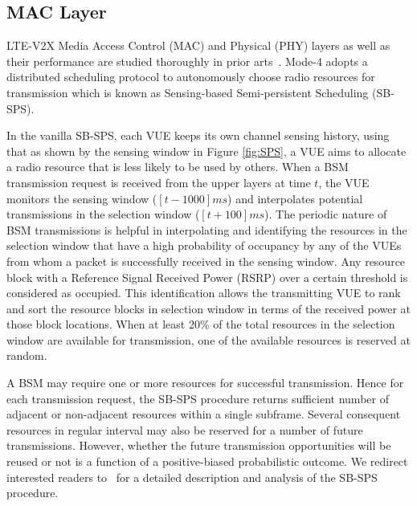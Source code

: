 \documentclass[iicol]{sn-jnl}%
\theoremstyle{thmstyleone}%
\theoremstyle{thmstyletwo}%
\theoremstyle{thmstylethree}%
\begin{document}
\subsection{MAC Layer}
LTE-V2X Media Access Control (MAC) and Physical (PHY) layers as well as their performance are studied thoroughly in prior arts~\cite{molina2017lte, toghi2018multiple}. Mode-4 adopts a distributed scheduling protocol to autonomously choose radio resources for transmission which is known as Sensing-based Semi-persistent Scheduling (SB-SPS). 

In the vanilla SB-SPS, each VUE keeps its own channel sensing history, using that as shown by the sensing window in Figure \mbox{\ref{fig:SPS}}, a VUE aims to allocate a radio resource that is less likely to be used by others. When a BSM transmission request is received from the upper layers at time $t$, the VUE monitors the sensing window ($[t-1000]ms$) and interpolates potential transmissions in the selection window ($[t+100]ms$). The periodic nature of BSM transmissions is helpful in interpolating and identifying the resources in the selection window that have a high probability of occupancy by any of the VUEs from whom a packet is successfully received in the sensing window. Any resource block with a Reference Signal Received Power (RSRP) over a certain threshold is considered as occupied. This identification allows the transmitting VUE to rank and sort the resource blocks in selection window in terms of the received power at those block locations. When at least 20\% of the total resources in the selection window are available for transmission, one of the available resources is reserved at random.

A BSM may require one or more resources for successful transmission. Hence for each transmission request, the SB-SPS procedure returns sufficient number of adjacent or non-adjacent resources within a single subframe. Several consequent resources in regular interval may also be reserved for a number of future transmissions. However, whether the future transmission opportunities will be reused or not is a function of a positive-biased probabilistic outcome. We redirect interested readers to\mbox{~\cite{toghi2018multiple, molina2017lte}} for a detailed description and analysis of the SB-SPS procedure.
\end{document}
